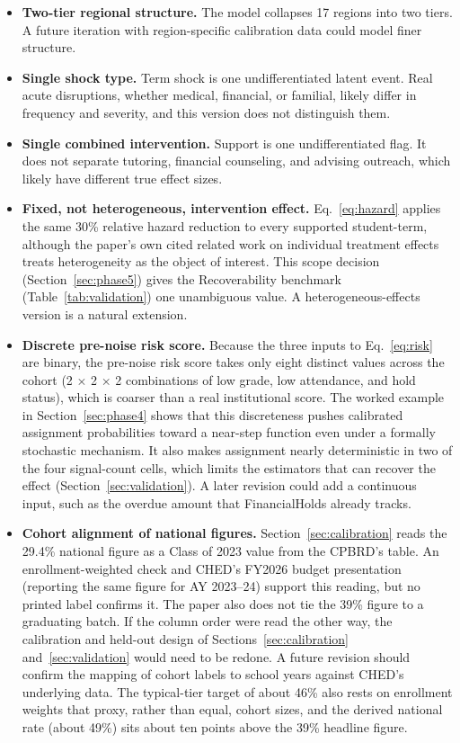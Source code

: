 \documentclass[11pt]{article}
\begin{document}
\begin{itemize}[topsep=2pt,itemsep=3pt,parsep=0pt]
\item \textbf{Two-tier regional structure.} The model collapses 17 regions into two tiers. A future iteration with region-specific calibration data could model finer structure.
\item \textbf{Single shock type.} Term shock is one undifferentiated latent event. Real acute disruptions, whether medical, financial, or familial, likely differ in frequency and severity, and this version does not distinguish them.
\item \textbf{Single combined intervention.} Support is one undifferentiated flag. It does not separate tutoring, financial counseling, and advising outreach, which likely have different true effect sizes.
\item \textbf{Fixed, not heterogeneous, intervention effect.} Eq.~\ref{eq:hazard} applies the same 30\% relative hazard reduction to every supported student-term, although the paper's own cited related work on individual treatment effects \citep{smith2020global} treats heterogeneity as the object of interest. This scope decision (Section~\ref{sec:phase5}) gives the Recoverability benchmark (Table~\ref{tab:validation}) one unambiguous value. A heterogeneous-effects version is a natural extension.
\item \textbf{Discrete pre-noise risk score.} Because the three inputs to Eq.~\ref{eq:risk} are binary, the pre-noise risk score takes only eight distinct values across the cohort (2 $\times$ 2 $\times$ 2 combinations of low grade, low attendance, and hold status), which is coarser than a real institutional score. The worked example in Section~\ref{sec:phase4} shows that this discreteness pushes calibrated assignment probabilities toward a near-step function even under a formally stochastic mechanism. It also makes assignment nearly deterministic in two of the four signal-count cells, which limits the estimators that can recover the effect (Section~\ref{sec:validation}). A later revision could add a continuous input, such as the overdue amount that FinancialHolds already tracks.
\item \textbf{Cohort alignment of national figures.} Section~\ref{sec:calibration} reads the 29.4\% national figure as a Class of 2023 value from the CPBRD's table. An enrollment-weighted check and CHED's FY2026 budget presentation (reporting the same figure for AY 2023--24) support this reading, but no printed label confirms it. The paper also does not tie the 39\% figure to a graduating batch. If the column order were read the other way, the calibration and held-out design of Sections~\ref{sec:calibration} and~\ref{sec:validation} would need to be redone. A future revision should confirm the mapping of cohort labels to school years against CHED's underlying data. The typical-tier target of about 46\% also rests on enrollment weights that proxy, rather than equal, cohort sizes, and the derived national rate (about 49\%) sits about ten points above the 39\% headline figure.

\end{itemize}
\end{document}
